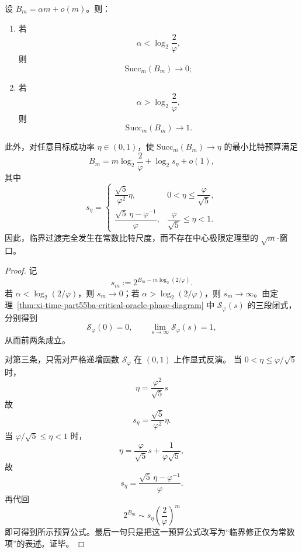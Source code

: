 \begin{corollary}[强逆定理与常数比特精确量化律]\label{cor:xi-time-part55ba-strong-converse-quantized-budget}
设 \(B_m=\alpha m+o(m)\)。则：
\begin{enumerate}
  \item 若
  \[
  \alpha<\log_2\frac{2}{\varphi},
  \]
  则
  \[
  \mathrm{Succ}_m(B_m)\to 0;
  \]
  \item 若
  \[
  \alpha>\log_2\frac{2}{\varphi},
  \]
  则
  \[
  \mathrm{Succ}_m(B_m)\to 1.
  \]
\end{enumerate}
此外，对任意目标成功率 \(\eta\in(0,1)\)，使 \(\mathrm{Succ}_m(B_m)\to\eta\) 的最小比特预算满足
\[
B_m
=
m\log_2\frac{2}{\varphi}
+\log_2 s_\eta
+o(1),
\]
其中
\[
s_\eta=
\begin{cases}
\dfrac{\sqrt5}{\varphi^2}\eta, & 0<\eta\le \dfrac{\varphi}{\sqrt5},\\[1.2ex]
\dfrac{\sqrt5\,\eta-\varphi^{-1}}{\varphi}, & \dfrac{\varphi}{\sqrt5}\le \eta<1.
\end{cases}
\]
因此，临界过渡完全发生在常数比特尺度，而不存在中心极限定理型的 \(\sqrt m\)-窗口。
\end{corollary}
\begin{proof}
记
\[
s_m:=2^{B_m-m\log_2(2/\varphi)}.
\]
若 \(\alpha<\log_2(2/\varphi)\)，则 \(s_m\to 0\)；若 \(\alpha>\log_2(2/\varphi)\)，则 \(s_m\to\infty\)。由定理~\ref{thm:xi-time-part55ba-critical-oracle-phase-diagram} 中 \(\mathcal S_\varphi(s)\) 的三段闭式，分别得到
\[
\mathcal S_\varphi(0)=0,
\qquad
\lim_{s\to\infty}\mathcal S_\varphi(s)=1,
\]
从而前两条成立。

对第三条，只需对严格递增函数 \(\mathcal S_\varphi\) 在 \((0,1)\) 上作显式反演。
当 \(0<\eta\le \varphi/\sqrt5\) 时，
\[
\eta=\frac{\varphi^2}{\sqrt5}s
\]
故
\[
s_\eta=\frac{\sqrt5}{\varphi^2}\eta.
\]
当 \(\varphi/\sqrt5\le \eta<1\) 时，
\[
\eta=\frac{\varphi}{\sqrt5}s+\frac{1}{\varphi\sqrt5},
\]
故
\[
s_\eta=\frac{\sqrt5\,\eta-\varphi^{-1}}{\varphi}.
\]
再代回
\[
2^{B_m}\sim s_\eta\left(\frac{2}{\varphi}\right)^m
\]
即可得到所示预算公式。最后一句只是把这一预算公式改写为“临界修正仅为常数项”的表述。证毕。
\end{proof}

